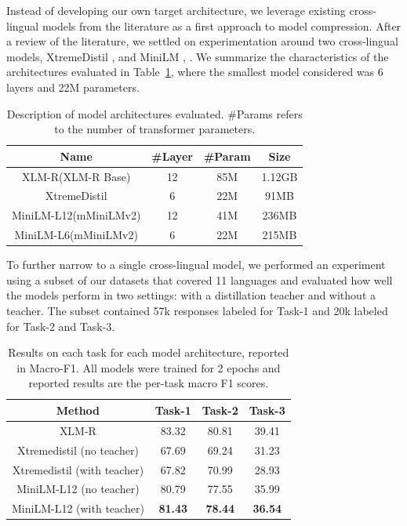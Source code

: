 Instead of developing our own target architecture, we leverage existing cross-lingual models from the literature as a first approach to model compression.
After a review of the literature, we settled on experimentation around two cross-lingual models, XtremeDistil \cite{mukherjee2020xtremedistil}, \cite{mukherjee2021xtremedistiltransformers} and MiniLM \cite{wang2020minilm}, \cite{wang2020minilmv2}.
We summarize the characteristics of the architectures evaluated in Table~\ref{table_archs}, where the smallest model considered was 6 layers and 22M parameters.

\begin{table}[h]
\centering
\begin{center}
\begin{tabular}{cccc}
    \hline
    \textbf{Name} & \textbf{\#Layer} & \textbf{\#Param} & \textbf{Size}\\
    \hline
    XLM-R(XLM-R Base) & 12 & 85M & 1.12GB \\
    XtremeDistil & 6 & 22M & 91MB \\
    MiniLM-L12(mMiniLMv2) & 12 & 41M & 236MB \\
    MiniLM-L6(mMiniLMv2) & 6 & 22M & 215MB \\
    \hline
\end{tabular}
\end{center}
\caption{Description of model architectures evaluated. \#Params refers to the number of transformer parameters. }
\label{table_archs}
\end{table}

To further narrow to a single cross-lingual model, we performed an experiment using a subset of our datasets that covered 11 languages and evaluated how well the models perform in two settings: with a distillation teacher and without a teacher.
The subset contained 57k responses labeled for Task-1 and 20k labeled for Task-2 and Task-3.

\begin{table}[h]
\centering
\begin{tabular}{cccc} 
    \hline
    \textbf{Method} & \textbf{Task-1} & \textbf{Task-2} & \textbf{Task-3} \\
    \hline
    XLM-R & 83.32 & 80.81 & 39.41 \\ \hline
    Xtremedistil \hspace{1cm} (no teacher) & 67.69 & 69.24 & 31.23 \\
    Xtremedistil (with teacher) & 67.82 & 70.99 & 28.93 \\
    MiniLM-L12 \hspace{1cm} (no teacher) & 80.79 & 77.55 & 35.99 \\
    MiniLM-L12 \hspace{1cm} (with teacher) & \textbf{81.43} & \textbf{78.44} & \textbf{36.54} \\
    \hline
\end{tabular}
\caption{Results on each task for each model architecture, reported in Macro-F1. All models were trained for 2 epochs and reported results are the per-task macro F1 scores.}
\label{table_arch_search}
\end{table}

